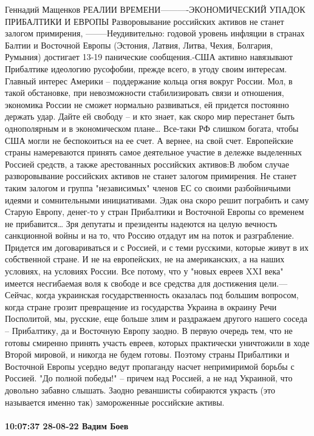 Геннадий Мащенков
РЕАЛИИ ВРЕМЕНИ----------ЭКОНОМИЧЕСКИЙ УПАДОК ПРИБАЛТИКИ И
ЕВРОПЫ Разворовывание российских активов не станет залогом
примирения, --------Неудивительно: годовой уровень
инфляции в странах Балтии и Восточной Европы (Эстония, Латвия, Литва,
Чехия, Болгария, Румыния) достигает 13-19%
панические сообщения.-США активно навязывают Прибалтике идеологию
русофобии, прежде всего, в
угоду своим интересам. Главный интерес Америки – поддержание кольца огня
вокруг России. Мол, в такой обстановке, при невозможности
стабилизировать связи и отношения, экономика России не сможет нормально
развиваться, ей придется постоянно держать удар. Дайте ей свободу – и
кто знает, как скоро мир перестанет быть однополярным и в экономическом
плане… Все-таки РФ слишком богата, чтобы США могли не беспокоиться на ее
счет. А вернее, на свой счет.
Европейские страны намереваются принять самое деятельное участие в
дележке выделенных Россией средств, а также арестованных российских
активов:В любом случае разворовывание российских активов не станет залогом
примирения. Не станет таким залогом и группа "независимых" членов ЕС со
своими разбойничьими идеями и сомнительными инициативами. Эдак она скоро
решит пограбить и саму Старую Европу, денег-то у стран Прибалтики и
Восточной Европы со временем не прибавится…
Зря депутаты и
президенты надеются на целую вечность санкционной войны и на то, что
Россию отдадут им на поток и разграбление. Придется им договариваться и с
Россией, и с теми русскими, которые живут в их собственной стране. И не
на европейских, не на американских, а на наших условиях, на условиях
России. Все потому, что у "новых евреев XXI века" имеется несгибаемая
воля к свободе и все средства для достижения цели.---Сейчас, когда украинская государственность оказалась под большим
вопросом, когда стране грозит превращение из государства Украина в
окраину Речи Посполитой, мы, русские, еще больше злим и раздражаем
другого нашего соседа – Прибалтику, да и Восточную Европу заодно. В
первую очередь тем, что не готовы смиренно принять участь евреев,
которых практически уничтожили в ходе Второй мировой, и никогда не будем
готовы. Поэтому страны Прибалтики и Восточной Европы усердно ведут
пропаганду насчет непримиримой борьбы с Россией. "До полной победы!" –
причем над Россией, а не над Украиной, что довольно забавно слышать.
Заодно реваншисты собираются украсть (это называется именно так)
замороженные российские активы.

\paragraph{10:07:37 28-08-22 Вадим Боев}

